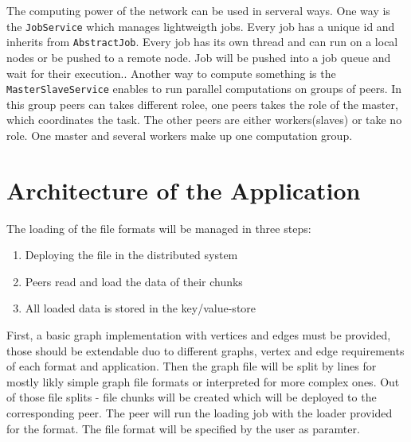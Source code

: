 The computing power of the network can be used in serveral ways. One way is the \texttt{JobService} which manages lightweigth jobs. Every job has a unique id and inherits from \texttt{AbstractJob}. Every job has its own thread and can run on a local nodes or be pushed to a remote node. Job will be pushed into a job queue and wait for their execution.. Another way to compute something is the \texttt{MasterSlaveService} enables to run parallel computations on groups of peers. In this group peers can takes different rolee, one peers takes the role of the master, which coordinates the task. The other peers are either workers(slaves) or take no role. One master and several workers make up one computation group.\cite{Beineke.20180714,dxramoverview}


\section{Architecture of the Application}
The loading of the file formats will be managed in three steps:
\begin{enumerate}
\item Deploying the file in the distributed system 
\item Peers read and load the data of their chunks
\item All loaded data is stored in the key/value-store
\end{enumerate}

First, a basic graph implementation with vertices and edges must be provided, those should be extendable duo to different graphs, vertex and edge requirements of each format and application.
Then the graph file will be split by lines for mostly likly simple graph file formats or interpreted for more complex ones. Out of those file splits - file chunks will be created which will be deployed to the corresponding peer. The peer will run the loading job with the loader provided for the format. The file format will be specified by the user as paramter.


